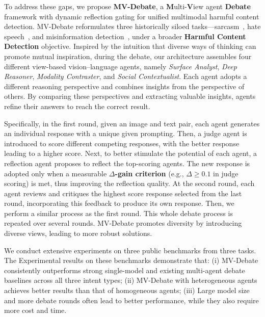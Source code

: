 \documentclass[letterpaper]{article} %
\begin{document}
To address these gaps, we propose \textbf{MV-Debate}, a \textbf{M}ulti-\textbf{V}iew agent \textbf{Debate} framework with dynamic reflection gating for unified multimodal harmful content detection.
MV-Debate reformulates three historically siloed tasks—sarcasm~\cite{benchekroun2022mmsd},  hate speech~\cite{kiela2020hateful}, and misinformation detection~\cite{shu2020fakenewsnet}, under a broader \textbf{Harmful Content Detection} objective.
Inspired by the intuition that diverse ways of thinking \cite{liu2025breaking} can promote mutual inspiration, during the debate,  our architecture assembles four different view-based vision–language agents, namely \emph{Surface Analyst}, \emph{Deep Reasoner}, \emph{Modality Contraster}, and \emph{Social Contextualist}.
Each agent adopts a different reasoning perspective and combines insights from the perspective of others.
By comparing these perspectives
and extracting valuable insights, agents refine their answers to reach the correct result. 



Specifically, in the first round, given an image and text pair, each agent generates an individual response with a unique given prompting. Then, a judge agent is introduced to score different competing responses, with the better response leading to a higher score.
Next, to better stimulate the potential of each agent, a reflection agent proposes to reflect the top-scoring agents. The new response is adopted only when a measurable \textbf{$\Delta$-gain criterion} (e.g., $\Delta \ge 0.1$ in judge scoring) is met, thus improving the reflection quality. At the second round, each agent reviews and critiques the highest score response selected from the last round, incorporating this feedback to produce its own response. Then, we perform a similar process as the first round. This whole debate process is repeated over several rounds.
MV-Debate promotes diversity by introducing diverse views, leading to more robust solutions. 



We conduct extensive experiments on three public benchmarks from three tasks.
The Experimental results on these benchmarks demonstrate that: (i) MV-Debate consistently outperforms strong single-model and existing multi-agent debate baselines across all three intent types;
(ii)  MV-Debate with heterogeneous agents achieves better results than that of homogeneous agents;
(iii) Large model size and more debate rounds often lead to better performance, while they also require more cost and time.
\end{document}
